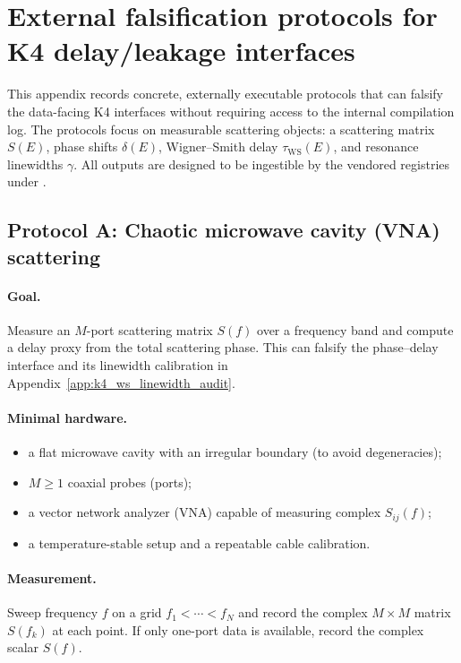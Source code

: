 \section{External falsification protocols for K4 delay/leakage interfaces}
\label{app:k4_external_falsification_protocols}
\label{app:external_falsification_protocols_k4}

\AuditTag This appendix records concrete, externally executable protocols that can falsify the data-facing K4 interfaces without requiring access to the internal compilation log.
The protocols focus on measurable scattering objects: a scattering matrix $S(E)$, phase shifts $\delta(E)$, Wigner--Smith delay $\tau_{\mathrm{WS}}(E)$, and resonance linewidths $\gamma$.
All outputs are designed to be ingestible by the vendored registries under .

\subsection{Protocol A: Chaotic microwave cavity (VNA) scattering}
\label{subsec:k4_falsify_microwave}

\paragraph{Goal.}
Measure an $M$-port scattering matrix $S(f)$ over a frequency band and compute a delay proxy from the total scattering phase.
This can falsify the phase--delay interface and its linewidth calibration in Appendix~\ref{app:k4_ws_linewidth_audit}.

\paragraph{Minimal hardware.}
\begin{itemize}
\item a flat microwave cavity with an irregular boundary (to avoid degeneracies);
\item $M\ge 1$ coaxial probes (ports);
\item a vector network analyzer (VNA) capable of measuring complex $S_{ij}(f)$;
\item a temperature-stable setup and a repeatable cable calibration.
\end{itemize}

\paragraph{Measurement.}
Sweep frequency $f$ on a grid $f_1<\cdots<f_N$ and record the complex $M\times M$ matrix $S(f_k)$ at each point.
If only one-port data is available, record the complex scalar $S(f)$.

